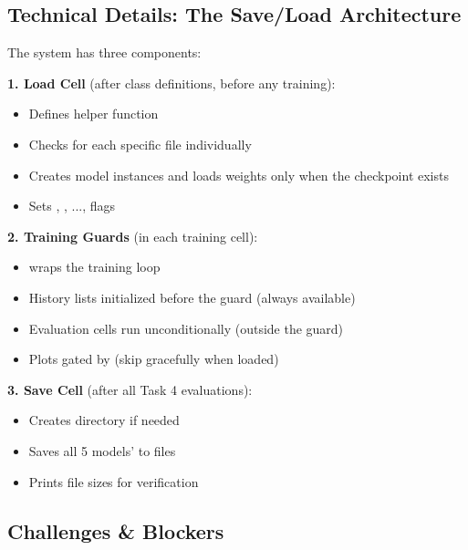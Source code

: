 \documentclass[9pt,a4paper,twocolumn,twoside]{tau-class/tau}
\begin{document}
    \subsection{Technical Details: The Save/Load Architecture}

        The system has three components:

        \textbf{1. Load Cell} (after class definitions, before any training):
        \begin{itemize}
            \item Defines  helper function
            \item Checks for each specific  file individually
            \item Creates model instances and loads weights only when the checkpoint exists
            \item Sets , , ...,  flags
        \end{itemize}

        \textbf{2. Training Guards} (in each training cell):
        \begin{itemize}
            \item {} wraps the training loop
            \item History lists initialized before the guard (always available)
            \item Evaluation cells run unconditionally (outside the guard)
            \item Plots gated by  (skip gracefully when loaded)
        \end{itemize}

        \textbf{3. Save Cell} (after all Task 4 evaluations):
        \begin{itemize}
            \item Creates  directory if needed
            \item Saves all 5 models'  to  files
            \item Prints file sizes for verification
        \end{itemize}

    \subsection{Challenges \& Blockers}
\end{document}
